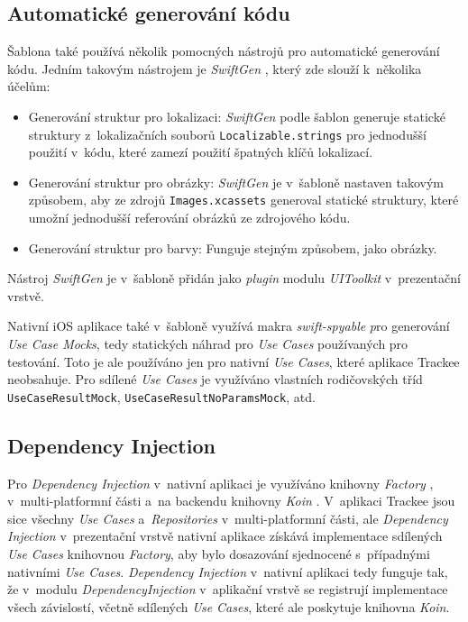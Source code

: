 \subsection{Automatické generování kódu}

Šablona také používá několik pomocných nástrojů pro automatické generování kódu. Jedním takovým nástrojem je \emph{SwiftGen} \cite{swiftgen}, který zde slouží k~několika účelům:
\begin{itemize}
\item Generování struktur pro lokalizaci: \emph{SwiftGen} podle šablon generuje statické struktury z~lokalizačních souborů \texttt{Localizable.strings} pro jednodušší použití v~kódu, které zamezí použití špatných klíčů lokalizací.
\item Generování struktur pro obrázky: \emph{SwiftGen} je v~šabloně nastaven takovým způsobem, aby ze zdrojů \texttt{Images.xcassets} generoval statické struktury, které umožní jednodušší referování obrázků ze zdrojového kódu.
\item Generování struktur pro barvy: Funguje stejným způsobem, jako obrázky.
\end{itemize}
Nástroj \emph{SwiftGen} je v~šabloně přidán jako \emph{plugin} modulu \emph{UIToolkit} v~prezentační vrstvě.

Nativní iOS aplikace také v~šabloně využívá makra \emph{swift-spyable} \cite{swift-spyable} \emph pro generování \emph{Use Case Mocks}, tedy statických náhrad pro \emph{Use Cases} používaných pro testování. Toto je ale používáno jen pro nativní \emph{Use Cases}, které aplikace Trackee neobsahuje. Pro sdílené \emph{Use Cases} je využíváno vlastních rodičovských tříd \texttt{UseCaseResultMock}, \texttt{UseCaseResultNoParamsMock}, atd.

\subsection{Dependency Injection}

Pro \emph{Dependency Injection} v~nativní aplikaci je využíváno knihovny \emph{Factory} \cite{factory}, v~multi-platformní části a~na backendu knihovny \emph{Koin} \cite{koin}. V~aplikaci Trackee jsou sice všechny \emph{Use Cases} a~\emph{Repositories} v~multi-platformní části, ale \emph{Dependency Injection} v~prezentační vrstvě nativní aplikace získává implementace sdílených \emph{Use Cases} knihovnou \emph{Factory}, aby bylo dosazování sjednocené s~případnými nativními \emph{Use Cases}. \emph{Dependency Injection} v~nativní aplikaci tedy funguje tak, že v~modulu \emph{DependencyInjection} v~aplikační vrstvě se registrují implementace všech závislostí, včetně sdílených \emph{Use Cases}, které ale poskytuje knihovna \emph{Koin}.

